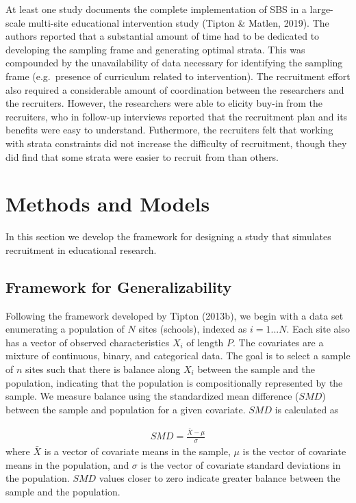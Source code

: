 \documentclass[man,floatsintext]{apa6}
\begin{document}
At least one study documents the complete implementation of SBS in a large-scale multi-site educational intervention study (Tipton \& Matlen, 2019). The authors reported that a substantial amount of time had to be dedicated to developing the sampling frame and generating optimal strata. This was compounded by the unavailability of data necessary for identifying the sampling frame (e.g.~presence of curriculum related to intervention). The recruitment effort also required a considerable amount of coordination between the researchers and the recruiters. However, the researchers were able to elicity buy-in from the recruiters, who in follow-up interviews reported that the recruitment plan and its benefits were easy to understand. Futhermore, the recruiters felt that working with strata constraints did not increase the difficulty of recruitment, though they did find that some strata were easier to recruit from than others.

\hypertarget{methods-and-models}{%
\section{Methods and Models}\label{methods-and-models}}

In this section we develop the framework for designing a study that simulates recruitment in educational research.

\hypertarget{framework-for-generalizability}{%
\subsection{Framework for Generalizability}\label{framework-for-generalizability}}

Following the framework developed by Tipton (2013b), we begin with a data set enumerating a population of \(N\) sites (schools), indexed as \(i = 1 ... N\). Each site also has a vector of observed characteristics \(X_i\) of length \(P\). The covariates are a mixture of continuous, binary, and categorical data. The goal is to select a sample of \(n\) sites such that there is balance along \(X_i\) between the sample and the population, indicating that the population is compositionally represented by the sample. We measure balance using the standardized mean difference (\(SMD\)) between the sample and population for a given covariate. \(SMD\) is calculated as

\begin{align} \label{eq:SMD}
  SMD = \frac{\bar{X}-\mu}{\sigma}
\end{align}
where \(\bar{X}\) is a vector of covariate means in the sample, \(\mu\) is the vector of covariate means in the population, and \(\sigma\) is the vector of covariate standard deviations in the population. \(SMD\) values closer to zero indicate greater balance between the sample and the population.
\end{document}

